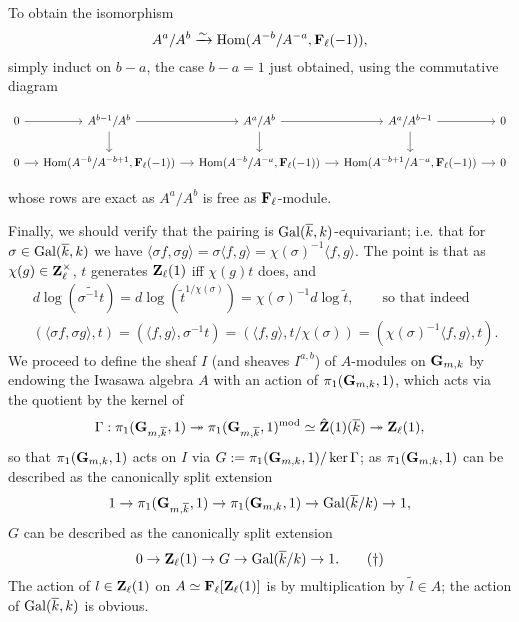 \documentclass[deligne.tex]{subfiles}
\begin{document}
To obtain the isomorphism
\begin{equation*}
	A^a/A^b\xrightarrow\sim\operatorname{Hom}(A^{-b}/A^{-a},\mathbf{F}_\ell(-1)),
\end{equation*}
simply induct on $b-a$, the case $b-a=1$ just obtained, using the
commutative diagram
{\footnotesize\begin{ceqn}\begin{equation*}\begin{tikzcd}[column sep=small]
	0\arrow[r]&A^{b-1}/A^b\arrow[r]\arrow[d]&A^a/A^b\arrow[r]\arrow[d]&A^a/A^{b-1}\arrow[r]\arrow[d]&0 \\
	0\arrow[r]&\Hom(A^{-b}/A^{-b+1},\FF_\ell(-1))\arrow[r]
	&\Hom(A^{-b}/A^{-a},\FF_\ell(-1))\arrow[r]
	&\Hom(A^{-b+1}/A^{-a},\FF_\ell(-1))\arrow[r]
	&0
\end{tikzcd}\end{equation*}\end{ceqn}}
whose rows are exact as $A^a/A^b$ is free as $\mathbf{F}_\ell$-module.

Finally, we should verify that the pairing is 
$\operatorname{Gal}(\overline k,k)$-equivariant; i.e. that for
$\sigma\in\operatorname{Gal}(\overline k,k)$ we have
$\langle\sigma f,\sigma g\rangle=\sigma\langle f,g\rangle=\chi(\sigma)^{-1}\langle f,g\rangle$.
The point is that as $\chi(g)\in\mathbf{Z}_\ell^\times$, $t$ generates
$\mathbf{Z}_\ell(1)$ iff $\chi(g)t$ does, and
\begin{align*}
	&d\log(\widetilde{\sigma^{-1} t})=d\log(\tilde t^{1/\chi(\sigma)})=\chi(\sigma)^{-1}d\log\tilde t,\qquad\text{so that indeed} \\
	&(\langle \sigma f,\sigma g\rangle,t)=(\langle f,g\rangle,\sigma^{-1}t)
	=(\langle f,g\rangle,t/\chi(\sigma))=(\chi(\sigma)^{-1}\langle f,g \rangle,t).
\end{align*}
We proceed to define the sheaf $I$ (and sheaves $I^{a,b}$) of
$A$-modules on $\mathbf{G}_{m,k}$ by endowing the Iwasawa algebra $A$ with an
action of $\pi_1(\mathbf{G}_{m,k},1)$, which acts via the quotient by the kernel of
\begin{equation*}
	\Gamma:\pi_1(\mathbf{G}_{m,\overline k},1)\twoheadrightarrow
	\pi_1(\mathbf{G}_{m,\overline k},1)^{\mathrm{mod}}\simeq
	\hat{\mathbf{Z}}(1)(\overline k)\twoheadrightarrow\mathbf{Z}_\ell(1),
\end{equation*}
so that $\pi_1(\mathbf{G}_{m,k},1)$ acts on $I$ via
$G:=\pi_1(\mathbf{G}_{m,k},1)/\ker\Gamma$; as $\pi_1(\mathbf{G}_{m,k},1)$ can be described
as the canonically split extension
\begin{equation*}
	1\rightarrow\pi_1(\mathbf{G}_{m,\overline k},1)\rightarrow\pi_1(\mathbf{G}_{m,k},1)\rightarrow
	\operatorname{Gal}(\overline k/k)\rightarrow1,
\end{equation*}
$G$ can be described as the canonically split extension
\cite[Exp. IX 6.1]{SGA1}
\begin{equation*}\label{glue:Gdef}
	0\rightarrow\mathbf{Z}_\ell(1)\rightarrow G\rightarrow\operatorname{Gal}(\overline k/k)\rightarrow1.\tag{$\dagger$}
\end{equation*}
The action of $l\in\mathbf{Z}_\ell(1)$ on $A\simeq\mathbf{F}_\ell[\mathbf{Z}_\ell(1)]$
is by multiplication by $\tilde l\in A$; the action of $\operatorname{Gal}(\overline k,k)$
is obvious.
\end{document}
